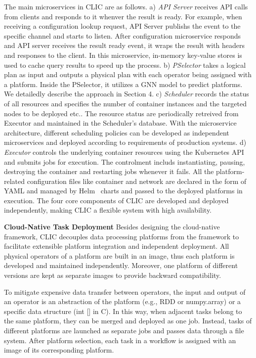 The main microservices in CLIC are as follows. a) \textit{API Server} receives API calls from clients and responds to it whenver the result is ready. 
For example, when receiving a configuration lookup request, API Server publishs the event to the specific channel and starts to listen. 
After configuration microservice responds and API server receives the result ready event, it wraps the result with headers and responses to the client. 
In this microservice, in-memory key-value stores is used to cache query results to speed up the process.
b) \textit{PSelector} takes a logical plan as input and outputs a physical plan with each operator being assigned with a platform. Inside the PSelector, it utilizes a GNN model to predict platforms. 
We detailedly describe the approach in Section 4.  
c) \textit{Scheduler} records the status of all resources and specifies the number of container instances and the targeted nodes to be deployed etc.. 
The resource status are periodically retreived from Executor and maintained in the Scheduler's database. 
With the microservice architecture, different scheduling policies can be developed as independent microservices and deployed according to requirements of production systems.
d) \textit{Executor} controls the underlying container resources using the Kubernetes API and submits jobs for execution. The controlment includs instantiating, pausing, destroying the container and restarting jobs whenever it fails. All the platform-related configuration files like container and network are declared in the form of YAML and managed by Helm~\cite{} charts and passed to the deployed platforms in execution.
The four core components of CLIC are developed and deployed independently, making CLIC a flexible system with high availability.



\textbf{Cloud-Native Task Deployment} Besides designing the cloud-native framework, CLIC decouples data processing platforms from the framework to facilitate extensible platform integration and independent deployment.
All physical operators of a platform are built in an image, thus each platform is developed and maintained independently.
Moreover, one platform of different versions are kept as separate images to provide backward compatibility.

To mitigate expensive data transfer between operators, the input and output of an operator is an abstraction of the platform (e.g., RDD or numpy.array) or a specific data structure (int [] in C).
In this way, when adjacent tasks belong to the same platform, they can be merged and deployed as one job.
Instead, tasks of different platforms are launched as separate jobs and passes data through a file system.
After platform selection, each task in a workflow is assigned with an image of its corresponding platform.

